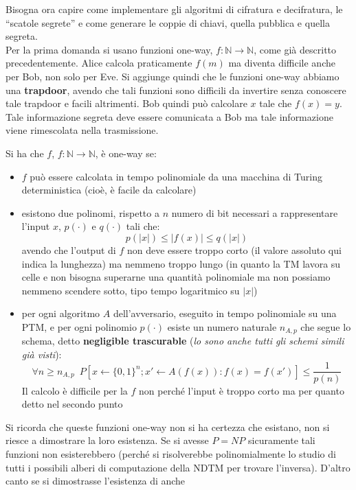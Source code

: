 \documentclass[a4paper,12pt, oneside]{book}
\begin{document}
Bisogna ora capire come implementare gli algoritmi di cifratura e decifratura,
le ``scatole segrete'' e
come generare le coppie di chiavi, quella pubblica e quella segreta.\\
Per la prima domanda si usano funzioni one-way, $f:\mathbb{N}\to\mathbb{N}$,
come già descritto precedentemente. Alice calcola praticamente $f(m)$ ma diventa
difficile anche per Bob, non solo per Eve. Si aggiunge quindi che le funzioni
one-way abbiamo una \textbf{trapdoor}, avendo che tali funzioni sono difficili
da invertire senza conoscere tale trapdoor e facili altrimenti. Bob quindi può
calcolare $x$ tale che $f(x)=y$. Tale informazione segreta deve essere
comunicata a Bob ma tale informazione viene rimescolata nella trasmissione.
\begin{definizione}
  Si ha che $f$, $f:\mathbb{N}\to\mathbb{N}$, è one-way se:
  \begin{itemize}
    \item $f$ può essere calcolata in tempo polinomiale da una macchina di
    Turing deterministica (cioè, è facile da calcolare)  
    \item esistono due polinomi, rispetto a $n$ numero di bit necessari a
    rappresentare l'input $x$, $p(\cdot)$ e $q(\cdot)$ tali che:
    \[p(|x|)\leq |f(x)|\leq q(|x|)\]
    avendo che l'output di $f$ non deve essere troppo corto (il valore assoluto
    qui indica la lunghezza) ma nemmeno troppo lungo (in quanto la TM lavora su
    celle e non bisogna superarne una quantità polinomiale ma non possiamo
    nemmeno scendere sotto, tipo tempo logaritmico su $|x|$) 
    \item per ogni algoritmo $A$ dell'avversario, eseguito in tempo polinomiale
    su una PTM, e per ogni polinomio $p(\cdot)$ esiste un numero naturale
    $n_{A,p}$ che segue lo schema, detto \textbf{negligible trascurable}
    (\textit{lo sono anche tutti gli schemi simili già visti}):
    \[\forall n\geq n_{A,p}\,\,\,P[x\gets\{0,1\}^n; x'\gets A(f(x)):
      f(x)=f(x')]\leq \frac{1}{p(n)}\]
    Il calcolo è difficile per la $f$ non perché l'input è troppo corto ma per
    quanto detto nel secondo punto
  \end{itemize}
\end{definizione}
Si ricorda che queste funzioni one-way non si ha certezza che esistano, non si
riesce a dimostrare la loro esistenza. Se si avesse $P=NP$ sicuramente tali
funzioni non esisterebbero (perché si risolverebbe polinomialmente lo studio di
tutti i possibili alberi di computazione della NDTM per trovare
l'inversa). D'altro canto se si dimostrasse l'esistenza di anche 
\end{document}
